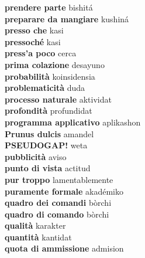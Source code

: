 \textbf{ prendere parte  } bishitá \\
\textbf{ preparare da mangiare  } kushiná \\
\textbf{ presso che  } kasi \\
\textbf{ pressoché  } kasi \\
\textbf{ press’a poco  } cerca \\
\textbf{ prima colazione  } desayuno \\
\textbf{ probabilità  } koinsidensia \\
\textbf{ problematicità  } duda \\
\textbf{ processo naturale  } aktividat \\
\textbf{ profondità  } profundidat \\
\textbf{ programma applicativo  } aplikashon \\
\textbf{ Prunus dulcis  } amandel \\
\textbf{ PSEUDOGAP!  } weta \\
\textbf{ pubblicità  } aviso \\
\textbf{ punto di vista  } actitud \\
\textbf{ pur troppo  } lamentablemente \\
\textbf{ puramente formale  } akadémiko \\
\textbf{ quadro dei comandi  } bòrchi \\
\textbf{ quadro di comando  } bòrchi \\
\textbf{ qualità  } karakter \\
\textbf{ quantità  } kantidat \\
\textbf{ quota di ammissione  } admision \\
